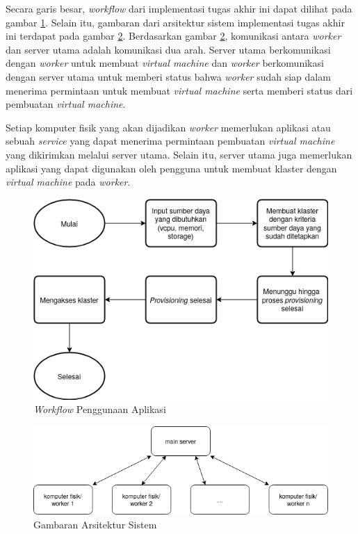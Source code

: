 Secara garis besar, \emph{workflow} dari implementasi tugas akhir ini dapat dilihat
pada gambar \ref{fig:website-flowchart}. Selain itu, gambaran dari arsitektur sistem
implementasi tugas akhir ini terdapat
pada gambar \ref{fig:server-worker-top-level}. Berdasarkan gambar \ref{fig:server-worker-top-level},
komunikasi antara \emph{worker} dan server utama adalah komunikasi dua arah. Server utama
berkomunikasi dengan \emph{worker} untuk membuat \emph{virtual machine} dan \emph{worker}
berkomunikasi dengan server utama untuk memberi status bahwa \emph{worker} sudah siap
dalam menerima permintaan untuk membuat \emph{virtual machine} serta memberi status dari
pembuatan \emph{virtual machine}.

Setiap komputer fisik yang akan dijadikan \emph{worker} memerlukan aplikasi
atau sebuah \emph{service} yang dapat menerima permintaan pembuatan 
\emph{virtual machine} yang dikirimkan melalui server utama. Selain itu,
server utama juga memerlukan aplikasi yang dapat digunakan oleh pengguna
untuk membuat klaster dengan \emph{virtual machine} pada \emph{worker}.

\begin{figure}[H]
  \centering
  \includegraphics[scale=0.6]{gambar/flowchart-website.png}
  \caption{\emph{Workflow} Penggunaan Aplikasi}
  \label{fig:website-flowchart}
\end{figure}

\begin{figure}[H]
  \centering
  \includegraphics[scale=0.6]{gambar/server-worker-top-level.png}
  \caption{Gambaran Arsitektur Sistem}
  \label{fig:server-worker-top-level}
\end{figure}

